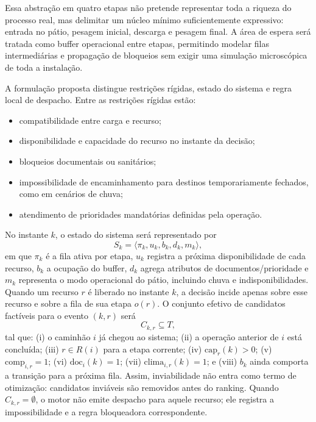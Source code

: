 \documentclass[
  12pt,
  oneside,
  a4paper,
  sumario=tradicional,
  brazil
]{abntex2}
\begin{document}
Essa abstra\c{c}\~ao em quatro etapas n\~ao pretende representar toda a riqueza do processo real, mas delimitar um n\'ucleo m\'inimo suficientemente expressivo: entrada no p\'atio, pesagem inicial, descarga e pesagem final. A \'area de espera ser\'a tratada como buffer operacional entre etapas, permitindo modelar filas intermedi\'arias e propaga\c{c}\~ao de bloqueios sem exigir uma simula\c{c}\~ao microsc\'opica de toda a instala\c{c}\~ao.

A formula\c{c}\~ao proposta distingue restri\c{c}\~oes r\'igidas, estado do sistema e regra local de despacho. Entre as restri\c{c}\~oes r\'igidas est\~ao:
\begin{itemize}[leftmargin=1.27cm,itemsep=0pt,topsep=0pt,parsep=0pt,partopsep=0pt]
  \item compatibilidade entre carga e recurso;
  \item disponibilidade e capacidade do recurso no instante da decis\~ao;
  \item bloqueios documentais ou sanit\'arios;
  \item impossibilidade de encaminhamento para destinos temporariamente fechados, como em cen\'arios de chuva;
  \item atendimento de prioridades mandat\'orias definidas pela opera\c{c}\~ao.
\end{itemize}

No instante $k$, o estado do sistema ser\'a representado por
\[
S_k = \langle \pi_k, u_k, b_k, d_k, m_k \rangle,
\]
em que $\pi_k$ \'e a fila ativa por etapa, $u_k$ registra a pr\'oxima disponibilidade de cada recurso, $b_k$ a ocupa\c{c}\~ao do buffer, $d_k$ agrega atributos de documentos/prioridade e $m_k$ representa o modo operacional do p\'atio, incluindo chuva e indisponibilidades. Quando um recurso $r$ \'e liberado no instante $k$, a decis\~ao incide apenas sobre esse recurso e sobre a fila de sua etapa $o(r)$. O conjunto efetivo de candidatos fact\'iveis para o evento $(k,r)$ ser\'a
\[
C_{k,r} \subseteq T,
\]
tal que: (i) o caminh\~ao $i$ j\'a chegou ao sistema; (ii) a opera\c{c}\~ao anterior de $i$ est\'a conclu\'ida; (iii) $r \in R(i)$ para a etapa corrente; (iv) $\text{cap}_r(k) > 0$; (v) $\text{comp}_{i,r}=1$; (vi) $\text{doc}_i(k)=1$; (vii) $\text{clima}_{i,r}(k)=1$; e (viii) $b_k$ ainda comporta a transi\c{c}\~ao para a pr\'oxima fila. Assim, inviabilidade n\~ao entra como termo de otimiza\c{c}\~ao: candidatos invi\'aveis s\~ao removidos antes do ranking. Quando $C_{k,r} = \emptyset$, o motor n\~ao emite despacho para aquele recurso; ele registra a impossibilidade e a regra bloqueadora correspondente.
\end{document}
